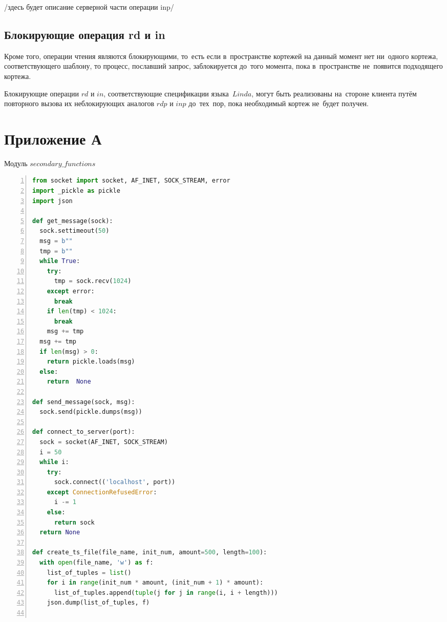 /здесь будет описание серверной части операции inp/

\subsection{Блокирующие операция rd и in}\label{subsec5:4}
Кроме того, операции чтения являются блокирующими, то~есть если в~пространстве кортежей на данный момент нет ни~одного кортежа, соответствующего шаблону, то процесс, пославший запрос, заблокируется до~того момента, пока в~пространстве не~появится подходящего кортежа.

Блокирующие операции $rd$ и $in$, соответствующие спецификации языка~$Linda$, могут быть реализованы на~стороне клиента путём повторного вызова их неблокирующих аналогов $rdp$ и $inp$ до~тех~пор, пока необходимый кортеж не~будет получен.





\Conc

\printbibliography[heading=bibintoc]

\appendix
{}
\section*{Приложение А}
\begin{ListingEnv}[H]\caption{Модуль $secondary\_functions$}\label{list:secfunc}
\begin{lstlisting}[language=Python, numbers=left]
from socket import socket, AF_INET, SOCK_STREAM, error
import _pickle as pickle
import json

def get_message(sock):
  sock.settimeout(50)
  msg = b""
  tmp = b""
  while True:
	try:
	  tmp = sock.recv(1024)
	except error:
	  break
	if len(tmp) < 1024:
	  break
	msg += tmp
  msg += tmp
  if len(msg) > 0:
	return pickle.loads(msg)
  else:
	return  None

def send_message(sock, msg):
  sock.send(pickle.dumps(msg))

def connect_to_server(port):
  sock = socket(AF_INET, SOCK_STREAM)
  i = 50
  while i:
	try:
	  sock.connect(('localhost', port))
	except ConnectionRefusedError:
	  i -= 1
	else:
	  return sock
  return None

def create_ts_file(file_name, init_num, amount=500, length=100):
  with open(file_name, 'w') as f:
	list_of_tuples = list()
	for i in range(init_num * amount, (init_num + 1) * amount):
	  list_of_tuples.append(tuple(j for j in range(i, i + length)))
	json.dump(list_of_tuples, f)
	
	\end{lstlisting}
\end{ListingEnv}

